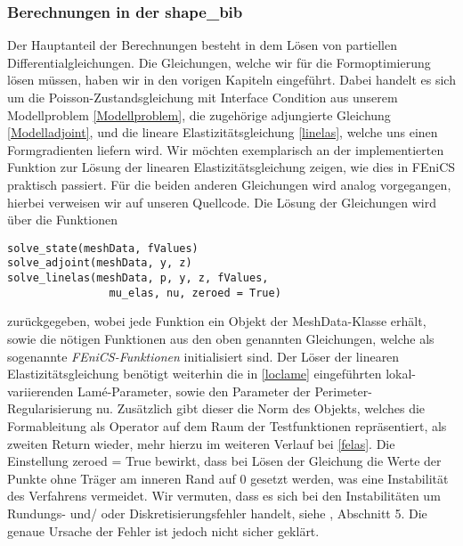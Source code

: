 \subsubsection{Berechnungen in der shape\_bib}\label{Berechnung_bib}
 Der Hauptanteil der Berechnungen besteht in dem Lösen von partiellen Differentialgleichungen. Die Gleichungen, welche wir für die Formoptimierung lösen müssen, haben wir in den vorigen Kapiteln eingeführt. Dabei handelt es sich um die Poisson-Zustandsgleichung mit Interface Condition aus unserem Modellproblem \ref{Modellproblem}, die zugehörige adjungierte Gleichung \ref{Modelladjoint}, und die lineare Elastizitätsgleichung \ref{linelas}, welche uns einen Formgradienten liefern wird. Wir möchten exemplarisch an der implementierten Funktion zur Lösung der linearen Elastizitätsgleichung zeigen, wie dies in FEniCS praktisch passiert. Für die beiden anderen Gleichungen wird analog vorgegangen, hierbei verweisen wir auf unseren Quellcode. Die Lösung der Gleichungen wird über die Funktionen 
\begin{lstlisting}
solve_state(meshData, fValues)
solve_adjoint(meshData, y, z)
solve_linelas(meshData, p, y, z, fValues, 
	            mu_elas, nu, zeroed = True)
\end{lstlisting}
zurückgegeben, wobei jede Funktion ein Objekt der \textsf{MeshData}-Klasse erhält, sowie die nötigen Funktionen aus den oben genannten Gleichungen, welche als sogenannte \textit{FEniCS-Funktionen} initialisiert sind. Der Löser der linearen Elastizitätsgleichung benötigt weiterhin die in \ref{loclame} eingeführten lokal-variierenden Lamé-Parameter, sowie den Parameter der Perimeter-Regularisierung \textsf{nu}. Zusätzlich gibt dieser die Norm des Objekts, welches die Formableitung als Operator auf dem Raum der Testfunktionen repräsentiert, als zweiten Return wieder, mehr hierzu im weiteren Verlauf bei \ref{felas}. Die Einstellung \textsf{zeroed = True} bewirkt, dass bei Lösen der Gleichung die Werte der Punkte ohne Träger am inneren Rand auf 0 gesetzt werden, was eine Instabilität des Verfahrens vermeidet. Wir vermuten, dass es sich bei den Instabilitäten um Rundungs- und/ oder Diskretisierungsfehler handelt, siehe \cite{bfgs2}, Abschnitt 5. Die genaue Ursache der Fehler ist jedoch nicht sicher geklärt. 


